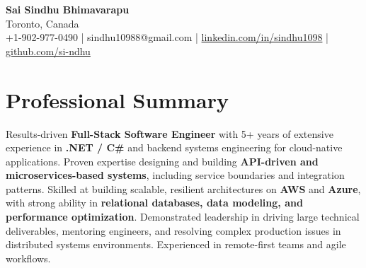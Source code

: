 \documentclass[letterpaper,11pt]{article}
\begin{document}
\begin{center}
  {\Large \textbf{Sai Sindhu Bhimavarapu}} \\
  Toronto, Canada \\
  +1-902-977-0490 \enspace | \enspace sindhu10988@gmail.com \enspace | \enspace \href{https://www.linkedin.com/in/sindhu1098/}{linkedin.com/in/sindhu1098} \enspace | \enspace \href{https://github.com/si-ndhu}{github.com/si-ndhu}
\end{center}

\section{Professional Summary}
  \begin{itemize}[leftmargin=0.15in, label={}]
    \small{\item{
     Results-driven \textbf{Full-Stack Software Engineer} with 5+ years of extensive experience in \textbf{.NET / C\#} and backend systems engineering for cloud-native applications. Proven expertise designing and building \textbf{API-driven and microservices-based systems}, including service boundaries and integration patterns. Skilled at building scalable, resilient architectures on \textbf{AWS} and \textbf{Azure}, with strong ability in \textbf{relational databases, data modeling, and performance optimization}. Demonstrated leadership in driving large technical deliverables, mentoring engineers, and resolving complex production issues in distributed systems environments. Experienced in remote-first teams and agile workflows.
    }}
  \end{itemize}
\vspace{-16pt}

\end{document}
